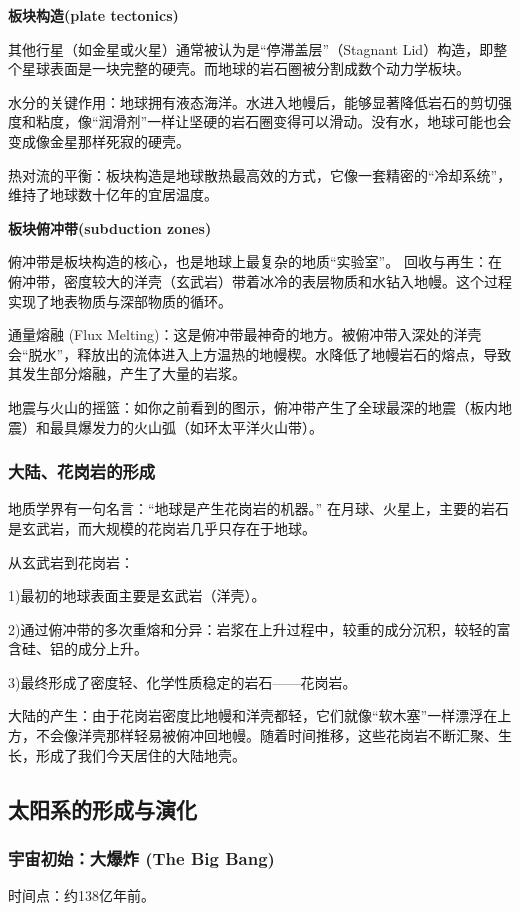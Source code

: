 \documentclass[12pt,a4paper]{article}
\begin{document}
	\textbf{板块构造(plate tectonics)}
	
	其他行星（如金星或火星）通常被认为是“停滞盖层”（Stagnant Lid）构造，即整个星球表面是一块完整的硬壳。而地球的岩石圈被分割成数个动力学板块。
	
	水分的关键作用：地球拥有液态海洋。水进入地幔后，能够显著降低岩石的剪切强度和粘度，像“润滑剂”一样让坚硬的岩石圈变得可以滑动。没有水，地球可能也会变成像金星那样死寂的硬壳。
	
	热对流的平衡：板块构造是地球散热最高效的方式，它像一套精密的“冷却系统”，维持了地球数十亿年的宜居温度。
	
	\textbf{板块俯冲带(subduction zones)}
	
	俯冲带是板块构造的核心，也是地球上最复杂的地质“实验室”。
	回收与再生：在俯冲带，密度较大的洋壳（玄武岩）带着冰冷的表层物质和水钻入地幔。这个过程实现了地表物质与深部物质的循环。
	
	通量熔融 (Flux Melting)：这是俯冲带最神奇的地方。被俯冲带入深处的洋壳会“脱水”，释放出的流体进入上方温热的地幔楔。水降低了地幔岩石的熔点，导致其发生部分熔融，产生了大量的岩浆。
	
	地震与火山的摇篮：如你之前看到的图示，俯冲带产生了全球最深的地震（板内地震）和最具爆发力的火山弧（如环太平洋火山带）。
	\subsubsection{大陆、花岗岩的形成}
	地质学界有一句名言：“地球是产生花岗岩的机器。” 在月球、火星上，主要的岩石是玄武岩，而大规模的花岗岩几乎只存在于地球。
	
	从玄武岩到花岗岩：
	
	1)最初的地球表面主要是玄武岩（洋壳）。
	
	2)通过俯冲带的多次重熔和分异：岩浆在上升过程中，较重的成分沉积，较轻的富含硅、铝的成分上升。
	
	3)最终形成了密度轻、化学性质稳定的岩石——花岗岩。
	
	大陆的产生：由于花岗岩密度比地幔和洋壳都轻，它们就像“软木塞”一样漂浮在上方，不会像洋壳那样轻易被俯冲回地幔。随着时间推移，这些花岗岩不断汇聚、生长，形成了我们今天居住的大陆地壳。
	
	\subsection{太阳系的形成与演化}
	\subsubsection{宇宙初始：大爆炸 (The Big Bang)}
	时间点：约138亿年前。
	
\end{document}
